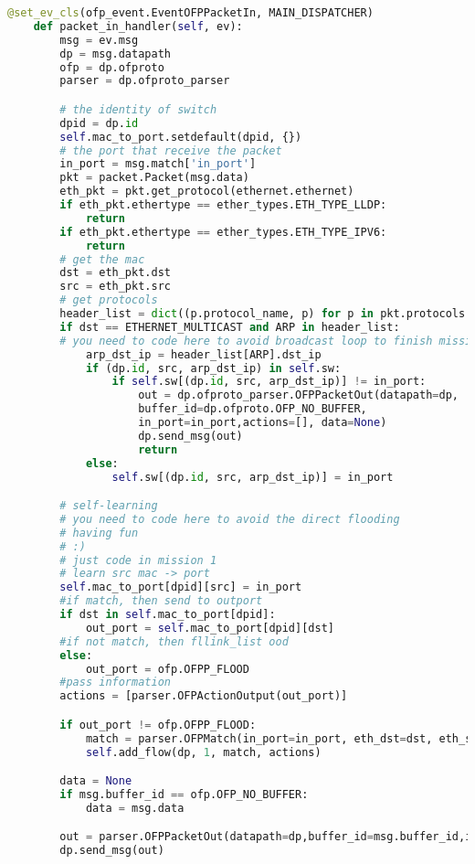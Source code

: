 \documentclass{xjtureport}
\begin{document}
\begin{lstlisting}[language=Python]
	@set_ev_cls(ofp_event.EventOFPPacketIn, MAIN_DISPATCHER)
	def packet_in_handler(self, ev):
		msg = ev.msg
		dp = msg.datapath
		ofp = dp.ofproto
		parser = dp.ofproto_parser

		# the identity of switch
		dpid = dp.id
		self.mac_to_port.setdefault(dpid, {})
		# the port that receive the packet
		in_port = msg.match['in_port']
		pkt = packet.Packet(msg.data)
		eth_pkt = pkt.get_protocol(ethernet.ethernet)
		if eth_pkt.ethertype == ether_types.ETH_TYPE_LLDP:
			return
		if eth_pkt.ethertype == ether_types.ETH_TYPE_IPV6:
			return
		# get the mac
		dst = eth_pkt.dst
		src = eth_pkt.src
		# get protocols
		header_list = dict((p.protocol_name, p) for p in pkt.protocols if type(p) != str)
		if dst == ETHERNET_MULTICAST and ARP in header_list:
		# you need to code here to avoid broadcast loop to finish mission 2
			arp_dst_ip = header_list[ARP].dst_ip
			if (dp.id, src, arp_dst_ip) in self.sw:
				if self.sw[(dp.id, src, arp_dst_ip)] != in_port:
					out = dp.ofproto_parser.OFPPacketOut(datapath=dp,
					buffer_id=dp.ofproto.OFP_NO_BUFFER,
					in_port=in_port,actions=[], data=None)
					dp.send_msg(out)
					return
			else:
				self.sw[(dp.id, src, arp_dst_ip)] = in_port

		# self-learning
		# you need to code here to avoid the direct flooding 
		# having fun 
		# :)
		# just code in mission 1
		# learn src mac -> port
		self.mac_to_port[dpid][src] = in_port
		#if match, then send to outport
		if dst in self.mac_to_port[dpid]:
			out_port = self.mac_to_port[dpid][dst]
		#if not match, then fllink_list ood
		else:
			out_port = ofp.OFPP_FLOOD
		#pass information
		actions = [parser.OFPActionOutput(out_port)]

		if out_port != ofp.OFPP_FLOOD:
			match = parser.OFPMatch(in_port=in_port, eth_dst=dst, eth_src=src)
			self.add_flow(dp, 1, match, actions)

		data = None
		if msg.buffer_id == ofp.OFP_NO_BUFFER:
			data = msg.data

		out = parser.OFPPacketOut(datapath=dp,buffer_id=msg.buffer_id,in_port=in_port, actions=actions, data=data)
		dp.send_msg(out)
\end{lstlisting}
\end{document}
